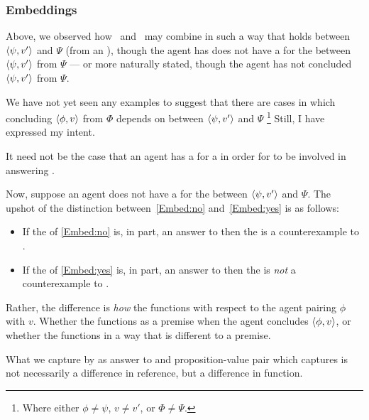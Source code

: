 \subsubsection{Embeddings}
\label{cha:var:sec:vars:issue:embeddings}

\begin{note}
  Above, we observed how~\supportI{} and~\supportII{} may combine in such a way that \support{} holds between \(\langle \psi, v' \rangle\) and \(\Psi\) (from an \agpe{}), though the agent has does not have a  for the  between \(\langle \psi, v' \rangle\) from \(\Psi\) --- or more naturally stated, though the agent has not concluded \(\langle \psi, v' \rangle\) from \(\Psi\).

  We have not yet seen any examples to suggest that there are cases in which concluding \(\langle \phi, v \rangle\) from \(\Phi\) depends on \ros{} between \(\langle \psi, v' \rangle\) and \(\Psi\)%
  \footnote{
    Where either \(\phi \ne \psi\), \(v \ne v'\), or \(\Phi \ne \Psi\).
  }
  Still, I have expressed my intent.

  It need not be the case that an agent has a  for a  in order for \ros{} to be involved in answering \qWhyVnP{}.
\end{note}

\begin{note}
  Now, suppose an agent does not have a  for the \ros{} between \(\langle \psi, v' \rangle\) and \(\Psi\).
  The upshot of the distinction between~\ref{Embed:no} and~\ref{Embed:yes} is as follows:

  \begin{itemize}
  \item
    If the  of \ref{Embed:no} is, in part, an answer to \qWhyVnP{} then the  is a counterexample to \issueConstraint{}.
  \item
    If the  of \ref{Embed:yes} is, in part, an answer to \qWhyVnP{} then the  is \emph{not} a counterexample to \issueConstraint{}.
  \end{itemize}


  Rather, the difference is \emph{how} the \ros{} functions with respect to the agent pairing \(\phi\) with \(v\).
  Whether the \ros{} functions as a premise when the agent concludes \(\langle \phi, v \rangle\), or whether the \ros{} functions in a way that is different to a premise.

  What we capture by \ros{} as answer to \qWhyVnP{} and proposition-value pair which captures \ros{} is not necessarily a difference in reference, but a difference in function.
\end{note}



